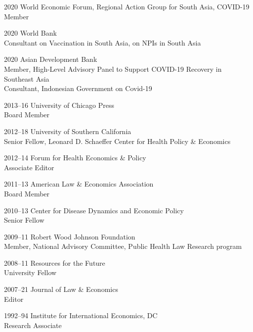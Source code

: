 \documentclass[11pt,letterpaper]{report}
\begin{document}
\begin{tablist}
        \item[2020]     \tab{}World Economic Forum, Regional Action Group for South Asia, COVID-19\\ Member
    
        \item[2020]     \tab{}World Bank \\
                              Consultant on Vaccination in South Asia, on NPIs in South Asia
    
        \item[2020]     \tab{}Asian Development Bank \\ 
                            Member, High-Level Advisory Panel to Support COVID-19 Recovery in Southeast Asia \\

                          Consultant, Indonesian Government on Covid-19
    
        \item[2013--16] \tab{}University of Chicago Press \\
                              Board Member
    
        \item[2012--18] \tab{}University of Southern California \\
                              Senior Fellow, Leonard D. Schaeffer Center for Health Policy \& Economics
    
        \item[2012--14] \tab{}Forum for Health Economics \& Policy \\
                              Associate Editor
    
        \item[2011--13] \tab{}American Law \& Economics Association \\
                              Board Member
    
        \item[2010--13] \tab{}Center for Disease Dynamics and Economic Policy \\
                              Senior Fellow
    
        \item[2009--11] \tab{}Robert Wood Johnson Foundation \\
                              Member, National Advisory Committee, Public Health Law Research program
    
        \item[2008--11] \tab{}Resources for the Future \\
                              University Fellow
    
        \item[2007--21] \tab{}Journal of Law \& Economics \\
                              Editor
    
        \item[1992--94] \tab{}Institute for International Economics, DC \\
                              Research Associate
    
    \end{tablist}
    
\end{document}

